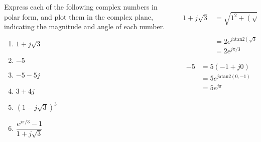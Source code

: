 \begin{frame}
    \begin{columns}[T]
        \begin{column}{0.3\textwidth}
            Express each of the following complex numbers in polar form, and plot them in the complex plane, indicating the magnitude and angle of each number.
            \begin{enumerate}[<alert@+>]
                \item $1 + j\sqrt{3}$
                \item $-5$
                \item $-5 -5j$
                \item $3+4j$
                \item $(1-j\sqrt{3})^3$
                \item $\dfrac{e^{j\pi/3}-1}{1+j\sqrt{3}}$
            \end{enumerate}

        \end{column}
        \begin{column}{0.7\textwidth}
        \begin{overprint}
                \begin{align*}
                  1 + j\sqrt{3} &= \sqrt{1^2 + (\sqrt{3})^2}\left(\dfrac{1}{\sqrt{1^2 + (\sqrt{3})^2}} + j\dfrac{\sqrt{3}}{\sqrt{1^2 + (\sqrt{3})^2}}\right) \\
                   &= 2e^{j\mathrm{atan2}(\sqrt{3}, 1)} \\
                   &= 2e^{j\pi/3}
                \end{align*}

                \begin{align*}
                  -5 &= 5(-1 + j0) \\
                   &= 5e^{j\mathrm{atan2}(0, -1)} \\
                   &= 5e^{j\pi}
                \end{align*}


\end{overprint}
\end{column}
\end{columns}
\end{frame}
